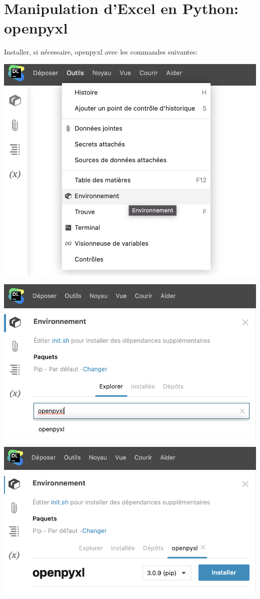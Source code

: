 \documentclass[a4paper]{article}
\begin{document}
\section{Manipulation d'Excel en Python: openpyxl}
Installer, si nécessaire,  openpyxl avec les commandes suivantes:
\begin{center}
\includegraphics[scale=0.58]{environnement.png} 
\end{center}
\begin{center}
\includegraphics[scale=0.58]{openpyxl.png} 
\end{center}
\begin{center}
\includegraphics[scale=0.58]{openpyxl2.png} 
\end{center}
\end{document}
